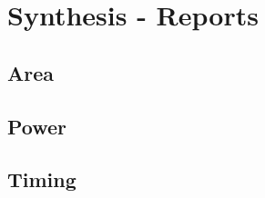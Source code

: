 \chapter{Synthesis - Reports}
\label{syn_rpt}

\section{Area}
	
	
\section{Power}
	

\section{Timing}
	
